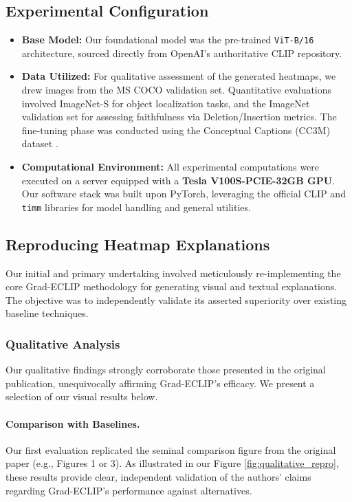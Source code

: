 \documentclass[10pt]{article} %
\begin{document}
\subsection{Experimental Configuration}

\begin{itemize}
    \item \textbf{Base Model:} Our foundational model was the pre-trained \texttt{ViT-B/16} architecture, sourced directly from OpenAI's authoritative CLIP repository.
    \item \textbf{Data Utilized:} For qualitative assessment of the generated heatmaps, we drew images from the MS COCO \citep{lin2014microsoft} validation set. Quantitative evaluations involved ImageNet-S \citep{gao2022large} for object localization tasks, and the ImageNet validation set for assessing faithfulness via Deletion/Insertion metrics. The fine-tuning phase was conducted using the Conceptual Captions (CC3M) dataset \citep{sharma2018conceptual}.
    \item \textbf{Computational Environment:} All experimental computations were executed on a server equipped with a \textbf{Tesla V100S-PCIE-32GB GPU}. Our software stack was built upon PyTorch, leveraging the official CLIP and \texttt{timm} libraries for model handling and general utilities.
\end{itemize}
\subsection{Reproducing Heatmap Explanations}

Our initial and primary undertaking involved meticulously re-implementing the core Grad-ECLIP methodology for generating visual and textual explanations. The objective was to independently validate its asserted superiority over existing baseline techniques.

\subsubsection{Qualitative Analysis}
Our qualitative findings strongly corroborate those presented in the original publication, unequivocally affirming Grad-ECLIP's efficacy. We present a selection of our visual results below.

\paragraph{Comparison with Baselines.}
Our first evaluation replicated the seminal comparison figure from the original paper (e.g., Figures 1 or 3). As illustrated in our Figure \ref{fig:qualitative_repro}, these results provide clear, independent validation of the authors' claims regarding Grad-ECLIP's performance against alternatives.
\end{document}
